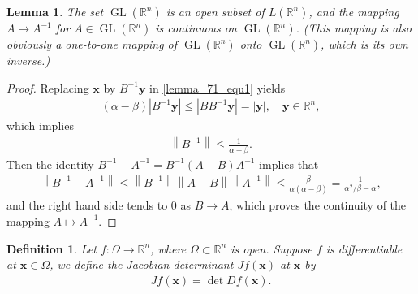 \documentclass[10pt]{book}
\newtheorem{definition}{Definition}[chapter]
\newtheorem{lemma}{Lemma}[chapter]
\theoremstyle{definition}
\numberwithin{equation}{chapter}
\begin{document}
\begin{lemma}\label{lemma_72}
The set $\operatorname{GL}(\mathbb{R}^n)$ is an open subset of $L(\mathbb{R}^n)$, and the mapping $A \mapsto A^{-1}$ for $A \in \operatorname{GL}(\mathbb{R}^n)$ is continuous on $\operatorname{GL}(\mathbb{R}^n)$. (This mapping is also obviously a one-to-one mapping of $\operatorname{GL}(\mathbb{R}^n)$ onto $\operatorname{GL}(\mathbb{R}^n)$, which is its own inverse.)
\end{lemma}
\begin{proof}
Replacing $\mathbf{x}$ by $B^{-1} \mathbf{y}$ in \eqref{lemma_71_equ1} yields
\begin{align*}
    (\alpha - \beta)\left|B^{-1} \mathbf{y}\right| \leq \left|B B^{-1} \mathbf{y}\right| = \left|\mathbf{y}\right|, \quad \mathbf{y} \in \mathbb{R}^n,
\end{align*}
which implies
\begin{align*}
    \left\|B^{-1}\right\| \leq \frac{1}{\alpha - \beta}.
\end{align*} 
Then the identity $B^{-1} - A^{-1} = B^{-1} (A - B) A^{-1}$ implies that
\begin{align*}
    \left\|B^{-1} - A^{-1}\right\| \leq \left\|B^{-1}\right\| \left\|A - B\right\| \left\|A^{-1}\right\| \leq \frac{\beta}{\alpha(\alpha - \beta)} = \frac{1}{\alpha^2/\beta - \alpha},
\end{align*}
and the right hand side tends to $0$ as $B \to A$, which proves the continuity of the mapping $A \mapsto A^{-1}$.
\end{proof}
    
\medskip

\begin{definition}
Let $f: \Omega \to \mathbb{R}^n$, where $\Omega \subset \mathbb{R}^n$ is open. Suppose $f$ is differentiable at $\mathbf{x} \in  \Omega$, we define the Jacobian determinant $Jf(\mathbf{x})$ at $\mathbf{x}$ by
\begin{align*}
    Jf(\mathbf{x}) = \det Df(\mathbf{x}).
\end{align*}
\end{definition}

\medskip
\end{document}
